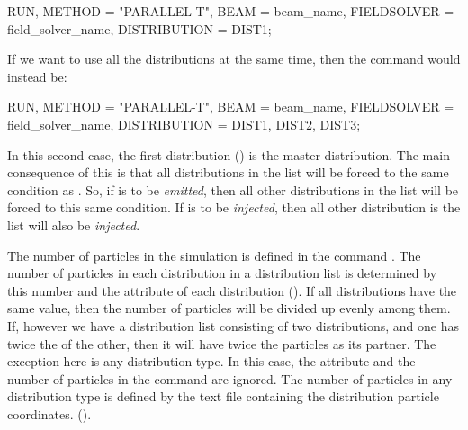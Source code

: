 \begin{example}
RUN, METHOD = "PARALLEL-T",
     BEAM = beam_name,
     FIELDSOLVER = field_solver_name,
     DISTRIBUTION = DIST1;
\end{example}
If we want to use all the distributions at the same time, then the command would instead be:

\begin{example}
RUN, METHOD = "PARALLEL-T",
     BEAM = beam_name,
     FIELDSOLVER = field_solver_name,
     DISTRIBUTION = {DIST1, DIST2, DIST3};
\end{example}
In this second case, the first distribution () is the master distribution. The main consequence of this is that
all distributions in the list will be forced to the same  condition as . So, if 
is to be \emph{emitted}, then all other distributions in the list will be forced to this same condition. If  is
to be \emph{injected}, then all other distribution is the list will also be \emph{injected}.

The number of particles in the simulation is defined in the  command . The number
of particles in each distribution in a distribution list is determined by this number and the  attribute
of each distribution (). If all distributions have the same  value, then
the number of particles will be divided up evenly among them. If, however we have a distribution list consisting of
two distributions, and one has twice the  of the other, then it will have twice the particles as its partner.
The exception here is any  distribution type. In this case, the  attribute and the number of
particles in the  command are ignored. The number of particles in any  distribution type is
defined by the text file containing the distribution particle coordinates. ().




